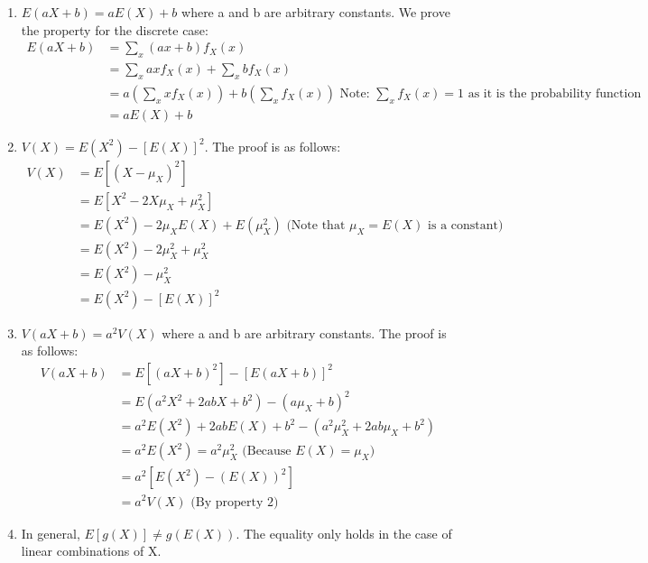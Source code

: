 \begin{enumerate}
    \item $E(aX + b) = a E(X) + b$ where a and b are arbitrary constants. We prove the property for the discrete case: 
    \begin{equation*}
    \begin{split}
    E(aX + b) &= \sum_x (ax + b)f_X(x) \\
    &= \sum_x ax f_X(x) + \sum_x b f_X(x) \\
    &= a \left( \sum_x x f_X(x) \right) + b \left( \sum_x f_X(x) \right ) \text{ Note: $\sum_x f_X(x) = 1$ as it is the probability function } \\
    &= a E(X) + b
    \end{split}
    \end{equation*}
    \item $V(X) = E(X^2) - [E(X)]^2$. The proof is as follows:
    \begin{equation*}
    \begin{split}
        V(X) &= E[(X - \mu_X)^2] \\
        &= E[X^2 - 2X\mu_X + \mu_X^2] \\
        &= E(X^2) - 2\mu_X E(X) + E(\mu_X^2) \text{ (Note that $\mu_X = E(X)$ is a constant)} \\
        &= E(X^2) - 2\mu_X^2 + \mu_X^2 \\
        &= E(X^2) - \mu_X^2 \\
        &= E(X^2) - [E(X)]^2
    \end{split}
    \end{equation*}
    \item $V(aX + b) = a^2V(X)$ where a and b are arbitrary constants. The proof is as follows:
    \begin{equation*}
    \begin{split}
    V(aX + b) &= E[(aX + b)^2] - [E(aX + b)]^2 \\
    &= E(a^2X^2 + 2abX + b^2) - (a\mu_X + b)^2 \\
    &= a^2E(X^2) + 2abE(X) + b^2 - (a^2\mu_X^2 + 2ab\mu_X + b^2) \\
    &= a^2E(X^2) = a^2\mu_X^2 \text{ (Because $E(X) = \mu_X$)} \\
    &= a^2[ E(X^2) - (E(X))^2] \\
    &= a^2 V(X) \text{ (By property 2)}
    \end{split}
    \end{equation*}
    
    \item In general, $E[g(X)] \neq g(E(X))$. The equality only holds in the case of linear combinations of X.
\end{enumerate}
